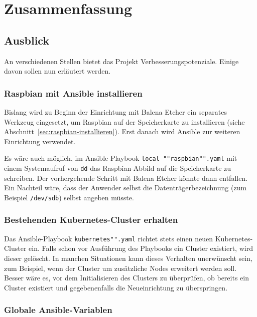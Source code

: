 \chapter{Zusammenfassung}\label{ch:zusammenfassung}

\section{Ausblick}\label{sec:ausblick}

An verschiedenen Stellen bietet das Projekt Verbesserungspotenziale.
Einige davon sollen nun erläutert werden.

\subsection{Raspbian mit Ansible installieren}

Bislang wird zu Beginn der Einrichtung mit Balena Etcher ein separates Werkzeug eingesetzt, um Raspbian auf der Speicherkarte zu installieren (siehe Abschnitt~\ref{sec:raspbian-installieren}).
Erst danach wird Ansible zur weiteren Einrichtung verwendet.

Es wäre auch möglich, im Ansible-Playbook \texttt{local-""raspbian"".yaml} mit einem Systemaufruf von \texttt{dd} das Raspbian-Abbild auf die Speicherkarte zu schreiben.
Der vorhergehende Schritt mit Balena Etcher könnte dann entfallen.
Ein Nachteil wäre, dass der Anwender selbst die Datenträgerbezeichnung (zum Beispiel \texttt{/dev/sdb}) selbst angeben müsste.

\subsection{Bestehenden Kubernetes-Cluster erhalten}

Das Ansible-Playbook \texttt{kubernetes"".yaml} richtet stets einen neuen Kubernetes-Cluster ein.
Falls schon vor Ausführung des Playbooks ein Cluster existiert, wird dieser gelöscht.
In manchen Situationen kann dieses Verhalten unerwünscht sein, zum Beispiel, wenn der Cluster um zusätzliche Nodes erweitert werden soll.
Besser wäre es, vor dem Initialisieren des Clusters zu überprüfen, ob bereits ein Cluster existiert und gegebenenfalls die Neueinrichtung zu überspringen.

\subsection{Globale Ansible-Variablen}

